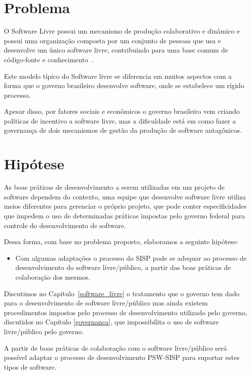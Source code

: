 \section{Problema}

O Software Livre possui um mecanismo de produção colaborativo e dinâmico 
e possui uma organização composta por um conjunto de pessoas que usa e desenvolve 
um único software livre, contribuindo para uma base comum de código-fonte e 
conhecimento~\cite{reis2003caracterizacc}.

Este modelo típico do Software livre se diferencia em muitos aspectos com a forma
que o governo brasileiro desenvolve software, onde se estabelece um rígido processo.

Apesar disso, por fatores sociais e econômicos o governo brasileiro vem
criando políticas de incentivo a software livre, mas a dificuldade está em como
fazer a governança de dois mecanismos de gestão da produção de software antagônicos. 

\section{Hipótese}

As boas práticas de desenvolvimento a serem utilizadas em um projeto de software 
dependem do contexto, uma equipe que desenvolve software livre utiliza
meios diferentes para gerenciar o próprio projeto, que pode conter especificidades 
que impedem o uso de determinadas práticas impostas pelo governo federal para controle
do desenvolvimento de software. 

Dessa forma, com base no problema proposto, elaboramos a seguinte hipótese:

\begin{itemize}
\item Com algumas adaptações o processo do SISP pode se adequar
ao processo de desenvolvimento do software livre/público, a partir das boas práticas 
de colaboração dos mesmos.
\end{itemize}

Discutimos no Capítulo~\ref{software_livre} o tratamento que o governo
tem dado para o desenvolvimento de software livre/público mas ainda existem procedimentos
impostos pelo processo de desenvolvimento utilizado pelo governo, discutidos no Capítulo
\ref{governanca}, que impossibilita o uso de software livre/público pelo governo.

A partir de boas práticas de colaboração com o software livre/público será possível
adaptar o processo de desenvolvimento PSW-SISP para suportar estes tipos de software. 


